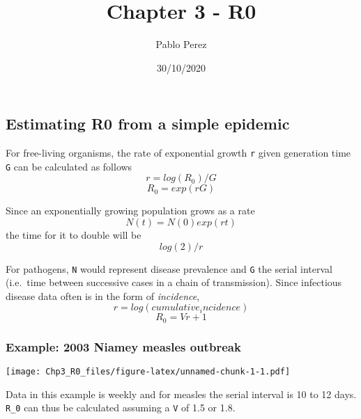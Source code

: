 \documentclass[]{article}
\title{Chapter 3 - R0}
\author{Pablo Perez}
\date{30/10/2020}
\newenvironment{Shaded}{\begin{snugshade}}{\end{snugshade}}
\newcommand{\DataTypeTok}[1]{\textcolor[rgb]{0.13,0.29,0.53}{#1}}
\newcommand{\DecValTok}[1]{\textcolor[rgb]{0.00,0.00,0.81}{#1}}
\newcommand{\FloatTok}[1]{\textcolor[rgb]{0.00,0.00,0.81}{#1}}
\newcommand{\KeywordTok}[1]{\textcolor[rgb]{0.13,0.29,0.53}{\textbf{#1}}}
\newcommand{\NormalTok}[1]{#1}
\newcommand{\OperatorTok}[1]{\textcolor[rgb]{0.81,0.36,0.00}{\textbf{#1}}}
\newcommand{\StringTok}[1]{\textcolor[rgb]{0.31,0.60,0.02}{#1}}
\begin{document}
\maketitle

\hypertarget{estimating-r0-from-a-simple-epidemic}{%
\subsection{Estimating R0 from a simple
epidemic}\label{estimating-r0-from-a-simple-epidemic}}

For free-living organisms, the rate of exponential growth \texttt{r}
given generation time \texttt{G} can be calculated as follows
\[r = log(R_0) / G\] \[R_0 = exp(rG)\]

Since an exponentially growing population grows as a rate
\[N(t) = N(0)exp(rt)\] the time for it to double will be \[log(2)/r\]

For pathogens, \texttt{N} would represent disease prevalence and
\texttt{G} the serial interval (i.e.~time between successive cases in a
chain of transmission). Since infectious disease data often is in the
form of \emph{incidence},
\[r = log(cumulative_incidence)\]\[R_0 = Vr + 1\]

\hypertarget{example-2003-niamey-measles-outbreak}{%
\subsubsection{Example: 2003 Niamey measles
outbreak}\label{example-2003-niamey-measles-outbreak}}

\texttt{[image: Chp3\_R0\_files/figure-latex/unnamed-chunk-1-1.pdf]}

Data in this example is weekly and for measles the serial interval is 10
to 12 days. \texttt{R\_0} can thus be calculated assuming a \texttt{V}
of 1.5 or 1.8.

\begin{Shaded}
\end{Shaded}
\end{document}
